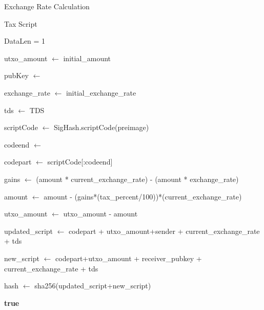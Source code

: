 \documentclass[a4paper,10pt,twocolumn]{extarticle}
\begin{document}
\begin{algorithm}[H]
\scriptsize
\DontPrintSemicolon
\caption{Exchange Rate Calculation}
\end{algorithm}

\begin{algorithm}[H]
\scriptsize
\DontPrintSemicolon
{} %
\caption{Tax Script}

	DataLen = 1\;
	
	utxo\_amount $\gets$ initial\_amount\;
	
	pubKey $\gets$ \;
	
	exchange\_rate $\gets$ initial\_exchange\_rate\;
	
	tds $\gets$ TDS \;

		{

			{

			scriptCode $\gets$ SigHash.scriptCode(preimage)\;

			codeend $\gets$ \;

			codepart $\gets$ scriptCode[:codeend]\;

			gains $\gets$ (amount * current\_exchange\_rate) - (amount * exchange\_rate)\;

				{

					amount $\gets$ amount - (gains*(tax\_percent/100))*(current\_exchange\_rate)\;

						{

						utxo\_amount $\gets$ utxo\_amount - amount\; 
						} 
				}
					
			updated\_script $\gets$ codepart + utxo\_amount+sender + current\_exchange\_rate + tds\;				 

			new\_script $\gets$ codepart+utxo\_amount + receiver\_pubkey + current\_exchange\_rate + tds\;
   
			hash $\gets$ sha256(updated\_script+new\_script)\;    
  
				{  
				\textbf{true}\; 
}
}
}
\end{algorithm}
\end{document}
